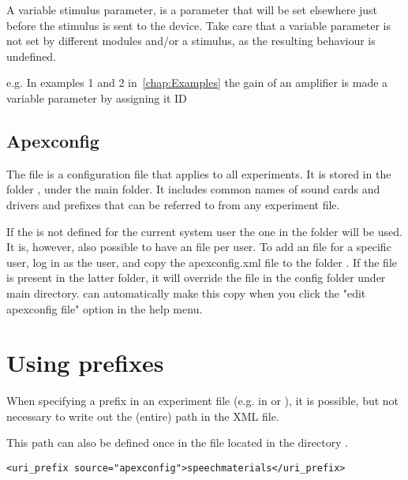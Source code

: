 \label{sec:Parameters}

A variable stimulus parameter, is a parameter that will be set
elsewhere just before the stimulus is sent to the device. Take care that a variable parameter is not set by different modules and/or a stimulus, as the resulting behaviour is undefined.

e.g. In examples 1 and 2 in~\ref{chap:Examples} the gain of an amplifier is made a
variable parameter by assigning it ID 


\subsection{Apexconfig}
\label{sec:apexconfig}


The  file is a configuration file that
applies to all experiments. It is stored in the folder
, under the main \apex folder. It includes common
names of sound cards and drivers and prefixes that can be referred
to from any experiment file.

If the  is not defined for the current system user
the one in the \apex folder will be used. It is, however, also possible to have
an  file per user. To add an
 file for a specific user, log in as the
user, and copy the apexconfig.xml file to the folder
. If the file
 is present in the latter folder, it will
override the  file in the config folder
under main \apex directory. \apex can automatically make this copy when you click the "edit apexconfig file" option in the help menu.


\section{Using prefixes} 

When specifying a prefix in an experiment file (e.g. in
 or ), it is possible, but
not necessary to write out the (entire) path in the XML file.

This path can also be defined once in the  file located in the directory .

\begin{lstlisting}
<uri_prefix source="apexconfig">speechmaterials</uri_prefix>
\end{lstlisting}

